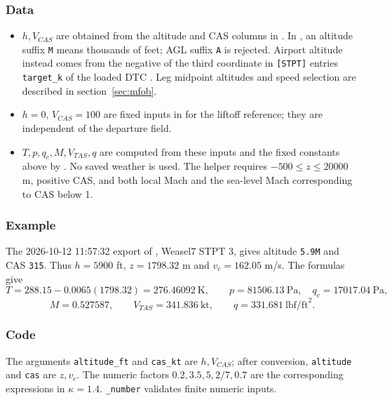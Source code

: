 \documentclass[10pt,a4paper]{amsart}
\begin{document}
\subsubsection*{Data}
\begin{itemize}
\setlength{\itemsep}{0pt}
\setlength{\parsep}{0pt}
\item $h,V_{CAS}$ are obtained from the altitude and CAS columns in
. In
, an altitude suffix \texttt{M} means
thousands of feet; AGL suffix \texttt{A} is rejected. Airport altitude
instead comes from the negative of the third coordinate in
\texttt{[STPT]} entries \texttt{target\_k} of the loaded DTC
. Leg midpoint altitudes and speed selection
are described in section~\ref{sec:mfob}.
\item $h=0$, $V_{CAS}=100$ are fixed inputs in 
for the liftoff reference; they are independent of the departure field.
\item $T,p,q_c,M,V_{TAS},q$ are computed from these inputs and the fixed
constants above by .
No saved weather is used. The helper requires $-500\leq z\leq20000$ m,
positive CAS, and both local Mach and the sea-level Mach corresponding
to CAS below 1.
\end{itemize}

\subsubsection*{Example}
The 2026-10-12 11:57:32 export of
, Weasel7 STPT 3, gives altitude
\texttt{5.9M} and CAS \texttt{315}. Thus $h=5900$ ft,
$z=1798.32$ m and $v_c=162.05$ m/s. The formulas give
\[
 T=288.15-0.0065(1798.32)=276.46092\ \text{K},\qquad
 p=81506.13\ \text{Pa},\quad q_c=17017.04\ \text{Pa},
\]
\[
 M=0.527587,\qquad V_{TAS}=341.836\ \text{kt},\qquad
 q=331.681\ \text{lbf/ft}^2.
\]

\subsubsection*{Code}
The arguments \texttt{altitude\_ft} and \texttt{cas\_kt} are $h,V_{CAS}$;
after conversion, \texttt{altitude} and \texttt{cas} are $z,v_c$.
The numeric factors $0.2,3.5,5,2/7,0.7$ are the corresponding expressions
in $\kappa=1.4$. \texttt{\_number} validates finite numeric inputs.
\end{document}
